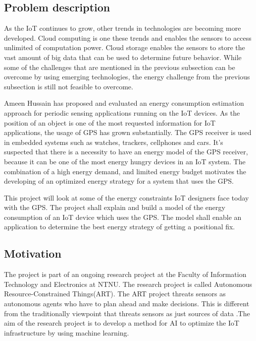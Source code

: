 \subsection{Problem description}

As the  IoT continues to grow, other trends in technologies are becoming more developed. Cloud computing is one these trends  and enables the sensors to access unlimited of computation power\cite{Cloud}. Cloud storage enables the sensors to store the vast amount of big data that can be used to determine future behavior. While some of the challenges that are mentioned in the previous subsection can be overcome by using emerging technologies, the energy challenge from the previous subsection is still not feasible to overcome. 

Ameen Hussain has proposed and evaluated an energy consumption estimation approach for periodic sensing applications running on the IoT devices\cite{Amen}. As the position of an object is one of the most requested information for IoT applications, the usage of GPS has grown substantially. The GPS receiver is used in embedded systems such as watches, trackers, cellphones and cars. It's suspected that there is a necessity to have an energy model of the GPS receiver, because it can be one of the most energy hungry devices in an IoT system. The combination of a high energy demand, and limited energy budget motivates the developing of an optimized energy strategy for a system that uses the GPS. 

This project will look at some of the energy constraints IoT designers face today with the GPS. The project shall explain and build a model of the energy consumption of an IoT device which uses the GPS. The model shall enable an application to determine the best energy strategy of getting a positional fix. 



\subsection{Motivation}

The project is part of an ongoing research project at the Faculty of Information Technology and Electronics at NTNU. The research project is called Autonomous Resource-Constrained Things(ART).  The ART project threats sensors as autonomous agents who have to plan ahead and make decisions. This is different from the traditionally viewpoint that threats sensors as just sources of data \cite{kraemer}.The aim of the research project is to develop a method for AI to optimize the IoT infrastructure by using machine learning.



